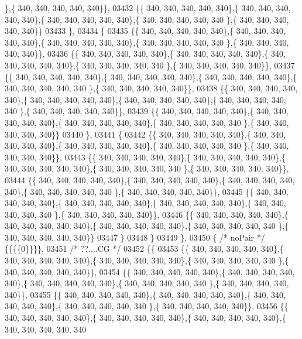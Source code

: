 \begin{DoxyCode}
      \},\{ 340, 340, 340, 340, 340\}\},
03432 \{\{ 340, 340, 340, 340, 340\},\{ 340, 340, 340, 340, 340\},\{ 340, 340, 340, 340, 340\},\{ 340, 340, 340, 340, 340
      \},\{ 340, 340, 340, 340, 340\}\}
03433 \},
03434 \{
03435 \{\{ 340, 340, 340, 340, 340\},\{ 340, 340, 340, 340, 340\},\{ 340, 340, 340, 340, 340\},\{ 340, 340, 340, 340, 340
      \},\{ 340, 340, 340, 340, 340\}\},
03436 \{\{ 340, 340, 340, 340, 340\},\{ 340, 340, 340, 340, 340\},\{ 340, 340, 340, 340, 340\},\{ 340, 340, 340, 340, 340
      \},\{ 340, 340, 340, 340, 340\}\},
03437 \{\{ 340, 340, 340, 340, 340\},\{ 340, 340, 340, 340, 340\},\{ 340, 340, 340, 340, 340\},\{ 340, 340, 340, 340, 340
      \},\{ 340, 340, 340, 340, 340\}\},
03438 \{\{ 340, 340, 340, 340, 340\},\{ 340, 340, 340, 340, 340\},\{ 340, 340, 340, 340, 340\},\{ 340, 340, 340, 340, 340
      \},\{ 340, 340, 340, 340, 340\}\},
03439 \{\{ 340, 340, 340, 340, 340\},\{ 340, 340, 340, 340, 340\},\{ 340, 340, 340, 340, 340\},\{ 340, 340, 340, 340, 340
      \},\{ 340, 340, 340, 340, 340\}\}
03440 \},
03441 \{
03442 \{\{ 340, 340, 340, 340, 340\},\{ 340, 340, 340, 340, 340\},\{ 340, 340, 340, 340, 340\},\{ 340, 340, 340, 340, 340
      \},\{ 340, 340, 340, 340, 340\}\},
03443 \{\{ 340, 340, 340, 340, 340\},\{ 340, 340, 340, 340, 340\},\{ 340, 340, 340, 340, 340\},\{ 340, 340, 340, 340, 340
      \},\{ 340, 340, 340, 340, 340\}\},
03444 \{\{ 340, 340, 340, 340, 340\},\{ 340, 340, 340, 340, 340\},\{ 340, 340, 340, 340, 340\},\{ 340, 340, 340, 340, 340
      \},\{ 340, 340, 340, 340, 340\}\},
03445 \{\{ 340, 340, 340, 340, 340\},\{ 340, 340, 340, 340, 340\},\{ 340, 340, 340, 340, 340\},\{ 340, 340, 340, 340, 340
      \},\{ 340, 340, 340, 340, 340\}\},
03446 \{\{ 340, 340, 340, 340, 340\},\{ 340, 340, 340, 340, 340\},\{ 340, 340, 340, 340, 340\},\{ 340, 340, 340, 340, 340
      \},\{ 340, 340, 340, 340, 340\}\}
03447 \}
03448 \}
03449 \},
03450 \{ \textcolor{comment}{/* noPair */} \{\{\{\{0\}\}\}\},
03451 \textcolor{comment}{/* ??....CG */}
03452 \{\{
03453 \{\{ 340, 340, 340, 340, 340\},\{ 340, 340, 340, 340, 340\},\{ 340, 340, 340, 340, 340\},\{ 340, 340, 340, 340, 340
      \},\{ 340, 340, 340, 340, 340\}\},
03454 \{\{ 340, 340, 340, 340, 340\},\{ 340, 340, 340, 340, 340\},\{ 340, 340, 340, 340, 340\},\{ 340, 340, 340, 340, 340
      \},\{ 340, 340, 340, 340, 340\}\},
03455 \{\{ 340, 340, 340, 340, 340\},\{ 340, 340, 340, 340, 340\},\{ 340, 340, 340, 340, 340\},\{ 340, 340, 340, 340, 340
      \},\{ 340, 340, 340, 340, 340\}\},
03456 \{\{ 340, 340, 340, 340, 340\},\{ 340, 340, 340, 340, 340\},\{ 340, 340, 340, 340, 340\},\{ 340, 340, 340, 340, 340

\end{DoxyCode}
